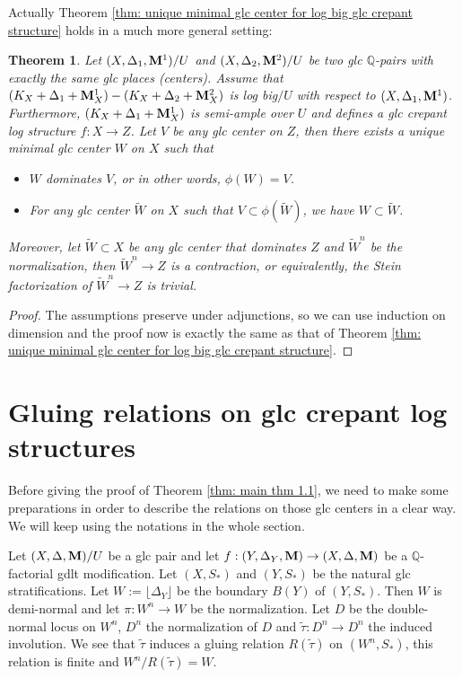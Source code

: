 \documentclass[11pt]{amsart}
\numberwithin{equation}{section}
\newcommand{\Mm}{{\bf{M}}}
\newcommand{\Qq}{\mathbb{Q}}
\newcommand{\lf}{\lfloor}
\newcommand{\rf}{\rfloor}
\newtheorem{thm}{Theorem}[section]
\theoremstyle{definition}
\theoremstyle{definition}
\theoremstyle{definition}
\begin{document}
Actually Theorem \ref{thm: unique minimal glc center for log big glc crepant structure} holds in a much more general setting:

\begin{thm}
Let $(X,\Delta_1,\Mm^1)/U$ and $(X,\Delta_2,\Mm^2)/U$ be two glc $\Qq$-pairs with exactly the same glc places (centers). Assume that $(K_X+\Delta_1+\Mm^1_X)-(K_X+\Delta_2+\Mm^2_X)$ is log big$/U$ with respect to $(X,\Delta_1,\Mm^1)$. Furthermore, $(K_X+\Delta_1+\Mm^1_X)$ is semi-ample over $U$ and defines a glc crepant log structure $f:X\to Z$. Let $V$ be any glc center on $Z$, then there exists a unique minimal glc center $W$ on $X$ such that
\begin{itemize}
    \item $W$ dominates $V$, or in other words, $\phi(W)=V$.
    \item For any glc center $\tilde{W}$ on $X$ such that $V\subset\phi(\tilde{W})$, we have $W\subset \tilde{W}$.
\end{itemize}
Moreover, let $\tilde{W}\subset X$ be any glc center that dominates $Z$ and $\tilde{W}^n$ be the normalization, then $\tilde{W}^n\to Z$ is a contraction, or equivalently, the Stein factorization of $\tilde{W}^n\to Z$ is trivial.
\end{thm}

\begin{proof}
The assumptions preserve under adjunctions, so we can use induction on dimension and the proof now is exactly the same as that of Theorem \ref{thm: unique minimal glc center for log big glc crepant structure}.
\end{proof}




\section{Gluing relations on glc crepant log structures}


Before giving the proof of Theorem \ref{thm: main thm 1.1}, we need to make some preparations in order to describe the relations on those glc centers in a clear way. We will keep using the notations in the whole section.

\vspace{.5em}

Let $(X,\Delta,\Mm)/U$ be a glc pair and let $f:(Y,\Delta_Y,\Mm)\to(X,\Delta,\Mm)$ be a $\Qq$-factorial gdlt modification. Let $(X,S_*)$ and $(Y,S_*)$ be the natural glc stratifications. Let $W:=\lf\Delta_Y\rf$ be the boundary $B(Y)$ of $(Y,S_*)$. Then $W$ is demi-normal and let $\pi: W^n\to W$ be the normalization. Let $D$ be the double-normal locus on $W^n$, $D^n$ the normalization of $D$ and $\tilde{\tau}:D^n\to D^n$ the induced involution. We see that $\tilde{\tau}$ induces a gluing relation $R(\tilde{\tau})$ on $(W^n,S_*)$, this relation is finite and $W^n/R(\tilde{\tau})=W$.
\end{document}

